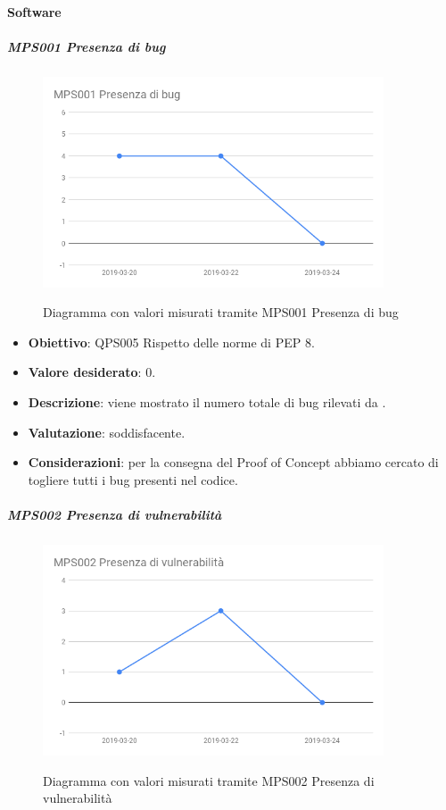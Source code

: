 	\paragraph{Software}

	\subparagraph{MPS001 Presenza di bug}
    
    \begin{figure}[H]
        \centering
        \includegraphics[width=0.9\textwidth]{img/cruscotti/MPS001.png}
        \label{immaginePresenzaBug}
        \caption{Diagramma con valori misurati tramite MPS001 Presenza di bug}
    \end{figure}
    
    \begin{itemize}
        \item \textbf{Obiettivo}: QPS005 Rispetto delle norme di PEP 8.
        \item \textbf{Valore desiderato}: 0.
        \item \textbf{Descrizione}: viene mostrato il numero totale di bug rilevati da .
        \item \textbf{Valutazione}: soddisfacente.
        \item \textbf{Considerazioni}: per la consegna del Proof of Concept abbiamo cercato di togliere tutti i bug presenti nel codice.
    \end{itemize}

    \subparagraph{MPS002 Presenza di vulnerabilità}
    
    \begin{figure}[H]
        \centering
        \includegraphics[width=0.9\textwidth]{img/cruscotti/MPS002.png}
        \label{immaginePresenzaVulnerabilità}
        \caption{Diagramma con valori misurati tramite MPS002 Presenza di vulnerabilità}
    \end{figure}
    
